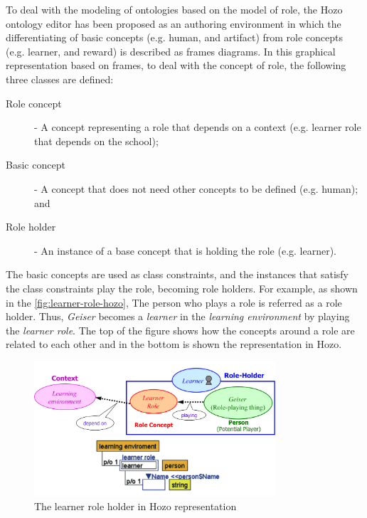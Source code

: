 To deal with the modeling of ontologies based on the model of role, the Hozo ontology editor \cite{KozakiKitamuraIkedaMizoguchi2002} has been proposed as an authoring environment in which the differentiating of basic concepts (e.g. human, and artifact) from role concepts (e.g. learner, and reward) is described as frames diagrams.
In this graphical representation based on frames, to deal with the concept of role, the following three classes are defined:

\begin{description}
  \item[Role concept] - A concept representing a role that depends on a context (e.g. learner role that depends on the school);
  \item[Basic concept] - A concept that does not need other concepts to be defined (e.g. human); and
  \item[Role holder] - An instance of a base concept that is holding the role (e.g. learner). 
\end{description}

The basic concepts are used as class constraints, and the instances that satisfy the class constraints play the role, becoming role holders.
For example, as shown in the \autoref{fig:learner-role-hozo}, 
The person who plays a role is referred as a role holder.
Thus, \emph{Geiser} becomes a \emph{learner} in the \emph{learning environment} by playing the \emph{learner role}.
The top of the figure shows how the concepts around a role are related to each other and in the bottom is shown the representation in Hozo.


\begin{figure}[htb]
 \caption{The learner role holder in Hozo representation}
 \label{fig:learner-role-hozo}
 \centering
 \includegraphics[width=0.8\textwidth]{images/chap-general-background/learner-role-hozo.png}
 \fautor
\end{figure}

